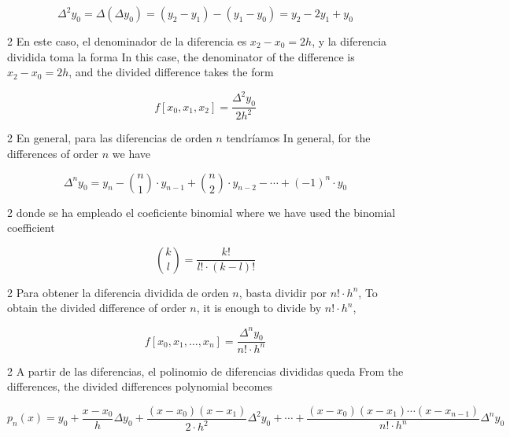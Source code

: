 \begin{equation*}
\Delta^2 y_0=\Delta \left(\Delta y_0 \right) =(y_2-y_1)-(y_1-y_0)=y_2-2y_1+y_0
\end{equation*}
\begin{paracol}{2}
En este caso, el denominador de la diferencia es $x_2-x_0=2h$, y la diferencia dividida toma la forma
\switchcolumn
In this case, the denominator of the difference is $x_2-x_0=2h$, and the divided difference takes the form
\end{paracol}
\begin{equation*}
f[x_0,x_1,x_2]=\frac{\Delta^2y_0}{2h^2}
\end{equation*}
\begin{paracol}{2}
En general, para las diferencias de orden $n$ tendríamos
\switchcolumn
In general, for the differences of order $n$ we have
\end{paracol}
\begin{equation*}
\Delta^n y_0=y_n-\binom{n}{1}\cdot y_{n-1}+\binom{n}{2}\cdot y_{n-2}-\cdots+(-1)^n\cdot y_0
\end{equation*}
\begin{paracol}{2}
donde se ha empleado el coeficiente binomial
\switchcolumn
where we have used the binomial coefficient
\end{paracol}
\begin{equation*}
\binom{k}{l}=\frac{k!}{l!\cdot(k-l)!}
\end{equation*}
\begin{paracol}{2}
Para obtener la diferencia dividida de orden $n$, basta dividir por $n!\cdot h^n$,
\switchcolumn
To obtain the divided difference of order $n$, it is enough to divide by $n!\cdot h^n$,
\end{paracol}
\begin{equation*}
f\left[x_0,x_1,\dots,x_n\right]=\frac{\Delta^n y_0}{n!\cdot h^n}
\end{equation*}
\begin{paracol}{2}
A partir de las diferencias, el polinomio de diferencias divididas queda
\switchcolumn
From the differences, the divided differences polynomial becomes
\end{paracol}
\begin{equation*}
p_n(x)=y_0+\frac{x-x_0}{h}\Delta y_0+\frac{(x-x_0)(x-x_1)}{2\cdot h^2}\Delta^2 y_0+\cdots +\frac{(x-x_0)(x-x_1)\cdots(x-x_{n-1})}{n! \cdot h^n}\Delta^n y_0
\end{equation*}
